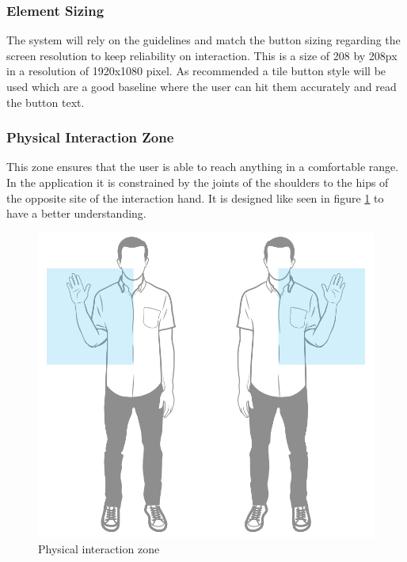 \subsubsection{Element Sizing}
The system will rely on the guidelines and match the button sizing regarding the screen resolution to keep reliability on interaction. This is a size of 208 by 208px in a resolution of 1920x1080 pixel. As recommended a tile button style will be used which are a good baseline where the user can hit them accurately and read the button text.

\subsubsection{Physical Interaction Zone}
This zone ensures that the user is able to reach anything in a comfortable range. In the application it is constrained by the joints of the shoulders to the hips of the opposite site of the interaction hand. It is designed like seen in figure \ref{fig:higPHIZ} to have a better understanding.
\begin{figure}[htb]
	\centering
	\begin{minipage}[t]{1\linewidth}
		\centering
		\includegraphics[width=0.5\linewidth]{Pictures/higPHIZ}
		\caption{Physical interaction zone~\cite{MicrosoftHIG2014-mh}}
		\label{fig:higPHIZ}
	\end{minipage}
\end{figure}

